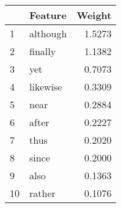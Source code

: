 \begin{tabular}{llr}
\toprule
{} &   Feature &  Weight \\
\midrule
1  &  although &  1.5273 \\
2  &   finally &  1.1382 \\
3  &       yet &  0.7073 \\
4  &  likewise &  0.3309 \\
5  &      near &  0.2884 \\
6  &     after &  0.2227 \\
7  &      thus &  0.2020 \\
8  &     since &  0.2000 \\
9  &      also &  0.1363 \\
10 &    rather &  0.1076 \\
\bottomrule
\end{tabular}
